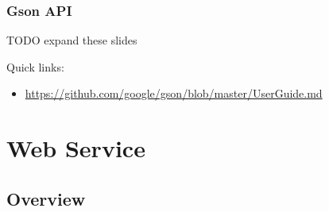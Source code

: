 \documentclass[presentation]{beamer}\mode<presentation>{\usetheme{AMSCesenaPurpleAndGold}}
\begin{document}
\begin{frame}%
    \frametitle{Gson API}

    TODO expand these slides

    Quick links:
    \begin{itemize}
        \item \url{https://github.com/google/gson/blob/master/UserGuide.md}
    \end{itemize}

\end{frame}

\section{\linda{} Web Service}

\subsection{Overview}
\end{document}
